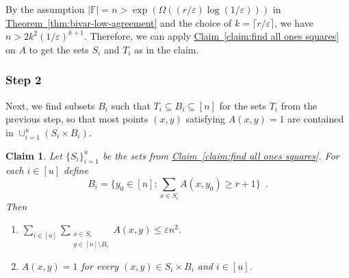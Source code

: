 \documentclass[11pt]{article}
\numberwithin{equation}{section}
\newtheorem{claim}[theorem]{Claim}
\theoremstyle{definition}
\theoremstyle{plain}
\newcommand{\expref}[2]{\hyperref[#2]{#1~\ref{#2}}}
\theoremstyle{plain}
\newcommand{\colored}{}
\newcommand{\blocklength}{\colored{n}} %
\newcommand{\Field}{\colored{\mathbb F}}
\newcommand{\degree}{\colored{r}}
\newcommand{\numrect}{\colored{u}}
\newcommand{\ceil}[1]{{\lceil#1\rceil}}
\newcommand{\eps}{\varepsilon}
\newcommand\abs[1]{\colored{\left|#1\right|}}
\begin{document}
    By the assumption $\abs{\Field} = n > \exp(\Omega(({\degree}/{\eps}) \log({1}/{\eps})))$
    in \expref{Theorem}{thm:bivar-low-agreement} and the choice of $k = \ceil{\degree/\eps}$, we have $\blocklength > 2k^2 \left({1}/{\eps}\right)^{k+1}$.
    Therefore, we can apply \expref{Claim}{claim:find all ones squares} on
 $A$ to get
%
the sets $S_i$ and $T_i$  %
    as in the claim.

 \subsubsection{Step 2}

    Next, we find subsets $B_i$ such that  $T_i \subseteq B_i \subseteq [\blocklength]$ for %
%
the sets $T_i$                  %
from the previous step, so that most points $(x,y)$ satisfying $A(x,y) = 1$ are contained in $\cup_{i=1}^{\numrect} (S_i \times B_i)$.
    \begin{claim}\label{claim:Si-Ti box}
        Let $\{S_i\}_{i=1}^{\numrect}$ be the sets from \expref{Claim}{claim:find all ones squares}.
        For each $i \in [\numrect]$ define
        \[
          B_i = \{ y_0 \in [\blocklength] : \sum_{x \in S_i} A(x,y_0) \geq \degree+1\}\enspace.
          \]
        Then
        \begin{enumerate}
        \item
            $\sum_{i \in [\numrect]} \sum_{\substack{x \in S_i \\ y \in [\blocklength] \setminus B_i}} A(x,y) \leq \eps \blocklength^2$.
        \item
            $A(x,y)=1$ for every $(x,y) \in S_i \times B_i$ and $i \in [\numrect]$.
    \end{enumerate}
    \end{claim}
\end{document}
